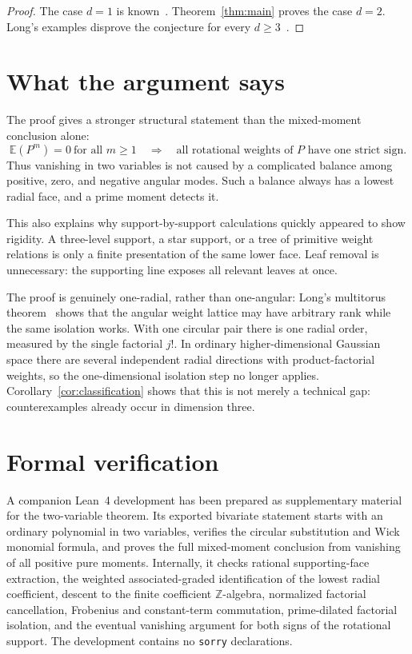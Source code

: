 \documentclass[11pt]{article}
\newcommand{\Z}{\mathbb Z}
\newcommand{\E}{\mathbb E}
\begin{document}
\begin{proof}
The case \(d=1\) is known~\cite[Proposition~4.2]{DVZ}.
Theorem~\ref{thm:main} proves the case \(d=2\).
Long's examples disprove the conjecture for every \(d\geq3\)~\cite{Long}.
\end{proof}

\section{What the argument says}

The proof gives a stronger structural statement than the mixed-moment
conclusion alone:
\[
  \E(P^m)=0\ \text{for all }m\geq1
  \quad\Longrightarrow\quad
  \text{all rotational weights of \(P\) have one strict sign.}
\]
Thus vanishing in two variables is not caused by a complicated balance
among positive, zero, and negative angular modes.  Such a balance always
has a lowest radial face, and a prime moment detects it.

This also explains why support-by-support calculations quickly appeared to
show rigidity.  A three-level support, a star support, or a tree of
primitive weight relations is only a finite presentation of the same lower
face.  Leaf removal is unnecessary: the supporting line exposes all
relevant leaves at once.

The proof is genuinely one-radial, rather than one-angular: Long's
multitorus theorem~\cite{LongTorus} shows that the angular weight lattice may
have arbitrary rank while the same isolation works.  With one circular pair
there is one radial order, measured by the single factorial \(j!\).  In
ordinary higher-dimensional Gaussian space there are several independent
radial directions with product-factorial weights, so the one-dimensional
isolation step no longer applies.
Corollary~\ref{cor:classification} shows that this is not merely a
technical gap: counterexamples already occur in dimension three.

\section{Formal verification}

A companion Lean~4 development has been prepared as supplementary material
for the two-variable theorem.  Its exported bivariate statement starts
with an ordinary polynomial in two variables, verifies the circular
substitution and Wick monomial formula, and proves the full mixed-moment
conclusion from vanishing of all positive pure moments.  Internally, it
checks rational supporting-face extraction, the weighted
associated-graded identification of the lowest radial coefficient, descent
to the finite coefficient \(\Z\)-algebra, normalized factorial
cancellation, Frobenius and constant-term commutation, prime-dilated
factorial isolation, and the eventual vanishing argument for both signs of
the rotational support.  The development contains no \texttt{sorry}
declarations.
\end{document}
